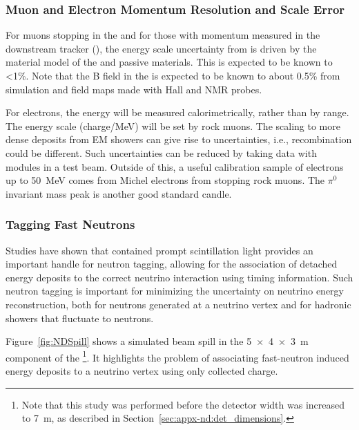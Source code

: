 \subsubsection{Muon and Electron Momentum Resolution and Scale Error}


For muons stopping in the  and for those with momentum measured in the downstream tracker (), the energy scale uncertainty from  is driven by the material model of the  and passive materials.  This is expected to be known to \textless 1\%.  Note that the B field in the  is expected to be known to about 0.5\% from simulation and field maps made with Hall and NMR probes.


For electrons, the energy will be measured calorimetrically, rather than by range.  The  energy scale (charge/MeV) will be set by rock muons.  The scaling to more dense deposits from EM showers can give rise to uncertainties, i.e., recombination could be different.  Such uncertainties can be reduced by taking data with  modules in a test beam.  Outside of this, a useful calibration sample
of electrons up to \SI{50}{MeV} comes from Michel electrons from stopping rock muons. The $\pi^0$ invariant mass peak is another good standard candle.



\subsubsection{Tagging Fast Neutrons}

Studies have shown that contained prompt scintillation light provides an important handle for neutron tagging, allowing for the association of detached energy deposits to the correct neutrino interaction using timing information. Such neutron tagging is important for minimizing the uncertainty on neutrino energy reconstruction, both for neutrons generated at a neutrino vertex and for hadronic showers that fluctuate to neutrons. 

Figure~\ref{fig:NDSpill} shows a simulated beam spill in the \SI[product-units=repeat]{5x4x3}{\metre}  component of the   \footnote{Note that this study was performed before the detector width was increased to \SI{7}{m}, as described in Section~\ref{sec:appx-nd:det_dimensions}.}. 
It highlights the problem of associating fast-neutron induced energy deposits to a neutrino vertex using only collected charge.  


